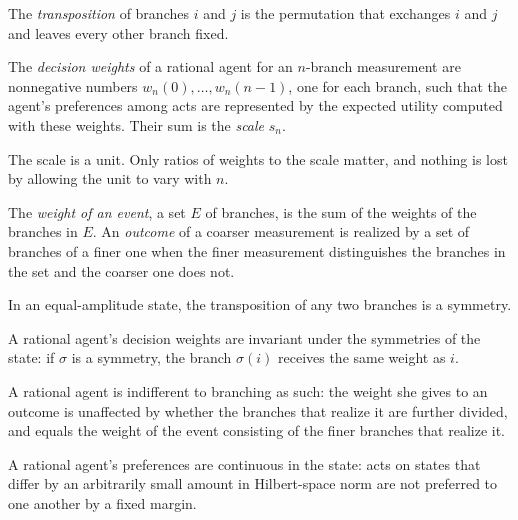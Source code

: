 \documentclass{situationist-preprint}
\begin{document}
\begin{definition}\label{d:swap}
The \emph{transposition} of branches $i$ and $j$ is the permutation that exchanges $i$ and $j$ and leaves every other branch fixed.
\end{definition}

\begin{definition}\label{d:weights}
The \emph{decision weights} of a rational agent for an $n$-branch measurement are nonnegative numbers $w_n(0),\dots,w_n(n-1)$, one for each branch, such that the agent's preferences among acts are represented by the expected utility computed with these weights. Their sum is the \emph{scale} $s_n$.
\end{definition}

The scale is a unit. Only ratios of weights to the scale matter, and nothing is lost by allowing the unit to vary with $n$.

\begin{definition}\label{d:event}
The \emph{weight of an event}, a set $E$ of branches, is the sum of the weights of the branches in $E$. An \emph{outcome} of a coarser measurement is realized by a set of branches of a finer one when the finer measurement distinguishes the branches in the set and the coarser one does not.
\end{definition}

\begin{assumption}\label{a:swap}
In an equal-amplitude state, the transposition of any two branches is a symmetry.
\end{assumption}

\begin{assumption}\label{a:invariance}
A rational agent's decision weights are invariant under the symmetries of the state: if $\sigma$ is a symmetry, the branch $\sigma(i)$ receives the same weight as $i$.
\end{assumption}

\begin{assumption}\label{a:indifference}
A rational agent is indifferent to branching as such: the weight she gives to an outcome is unaffected by whether the branches that realize it are further divided, and equals the weight of the event consisting of the finer branches that realize it.
\end{assumption}

\begin{assumption}[Continuity]\label{a:continuity}
A rational agent's preferences are continuous in the state: acts on states that differ by an arbitrarily small amount in Hilbert-space norm are not preferred to one another by a fixed margin.
\end{assumption}
\end{document}
